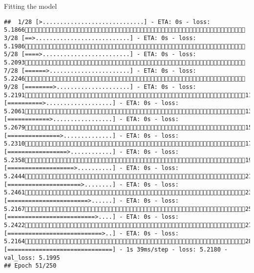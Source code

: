 \documentclass[
  ignorenonframetext,
]{beamer}
\begin{document}
\begin{frame}[fragile]{Fitting the model}
\begin{verbatim}
##  1/28 [>.............................] - ETA: 0s - loss: 5.1866 3/28 [==>...........................] - ETA: 0s - loss: 5.1986 5/28 [====>.........................] - ETA: 0s - loss: 5.2093 7/28 [======>.......................] - ETA: 0s - loss: 5.2246 9/28 [========>.....................] - ETA: 0s - loss: 5.219111/28 [==========>...................] - ETA: 0s - loss: 5.206113/28 [============>.................] - ETA: 0s - loss: 5.267915/28 [===============>..............] - ETA: 0s - loss: 5.231017/28 [=================>............] - ETA: 0s - loss: 5.235819/28 [===================>..........] - ETA: 0s - loss: 5.244421/28 [=====================>........] - ETA: 0s - loss: 5.246123/28 [=======================>......] - ETA: 0s - loss: 5.216725/28 [=========================>....] - ETA: 0s - loss: 5.242227/28 [===========================>..] - ETA: 0s - loss: 5.216428/28 [==============================] - 1s 39ms/step - loss: 5.2180 - val_loss: 5.1995
## Epoch 51/250

\end{verbatim}
\end{frame}
\end{document}
